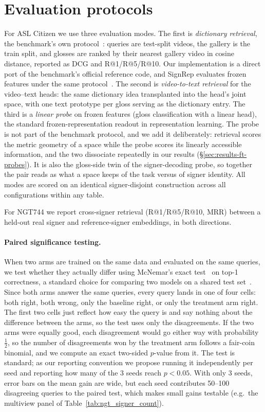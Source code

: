 \section{Evaluation protocols}
\label{sec:eval-protocols}
For ASL Citizen we use three evaluation modes. The first is
\emph{dictionary retrieval}, the benchmark's own
protocol~\cite{aslcitizen}: queries are test-split videos, the gallery
is the train split, and glosses are ranked by their nearest gallery
video in cosine distance, reported as DCG and R@1/R@5/R@10. Our
implementation is a direct port of the benchmark's official reference
code, and SignRep evaluates frozen features under the same
protocol~\cite{wongSignRepEnhancingSelfSupervised2025}. The second is
\emph{video-to-text retrieval} for the video--text heads: the same
dictionary idea transplanted into the head's joint space, with one text
prototype per gloss serving as the dictionary entry. The third is a
\emph{linear probe} on frozen features (gloss classification with a
linear head), the standard frozen-representation readout in
representation learning. The probe is not part of the benchmark
protocol, and we add it deliberately: retrieval scores the metric
geometry of a space while the probe scores its linearly accessible
information, and the two dissociate repeatedly in our results
(\S\ref{sec:results-ft-probes}). It is also the gloss-side twin of the
signer-decoding probe, so together the pair reads as what a space keeps
of the task versus of signer identity. All modes are scored on an
identical signer-disjoint construction across all configurations within
any table.

For NGT744 we report cross-signer retrieval
(R@1/R@5/R@10, MRR) between a held-out real signer and reference-signer
embeddings, in both directions. 

\paragraph{Paired significance testing.} When two arms are trained on the
same data and evaluated on the same queries, we test whether they actually
differ using McNemar's exact test~\cite{mcnemar1947note} on top-1
correctness, a standard choice for comparing two models on a shared test
set~\cite{dietterich1998approximate}. Since both arms answer the same
queries, every query lands in one of four cells: both right, both wrong,
only the baseline right, or only the treatment arm right. The first two
cells just reflect how easy the query is and say nothing about the
difference between the arms, so the test uses only the disagreements. If
the two arms were equally good, each disagreement would go either way with
probability $\tfrac{1}{2}$, so the number of disagreements won by the
treatment arm follows a fair-coin binomial, and we compute an exact
two-sided $p$-value from it. The test is standard; as our reporting
convention we propose running it independently per seed and reporting
how many of the 3 seeds reach $p<0.05$. With only 3 seeds, error bars on
the mean gain are wide, but each seed contributes 50--100 disagreeing
queries to the paired test, which makes small gains testable (e.g.\ the
multiview panel of Table~\ref{tab:ngt_signer_count}).
